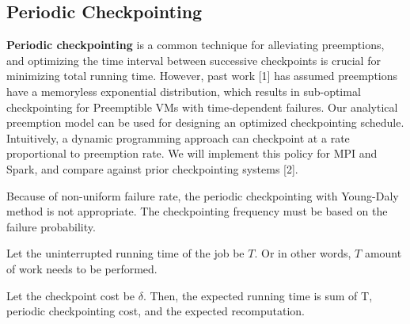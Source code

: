 
\subsection{Periodic Checkpointing}

\noindent \textbf{Periodic checkpointing} is a common technique for alleviating preemptions, and optimizing the time interval between successive checkpoints is crucial for minimizing total running time. 
However, past work [1] has assumed preemptions have a memoryless exponential distribution, which results in sub-optimal checkpointing for Preemptible VMs with time-dependent failures. 
Our analytical preemption model can be used for designing an optimized checkpointing schedule. 
Intuitively, a dynamic programming approach can checkpoint at a rate proportional to preemption rate. %
We will implement this policy for MPI and Spark, and compare against prior checkpointing systems [2]. 


Because of non-uniform failure rate, the periodic checkpointing with Young-Daly method is not appropriate.
The checkpointing frequency must be based on the failure probability.


Let the uninterrupted running time of the job be $T$. Or in other words, $T$ amount of work needs to be performed. 

Let the checkpoint cost be $\delta$. 
Then, the expected running time is sum of T, periodic checkpointing cost, and the expected recomputation.

